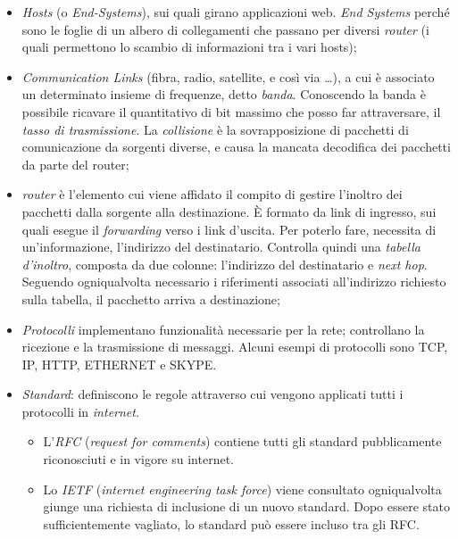 \begin{itemize}
    \item
        \textit{Hosts} (o \textit{End-Systems}), sui quali girano applicazioni web. \textit{End Systems} perché sono le foglie di un albero di collegamenti che passano per diversi \textit{router} (i quali permettono lo scambio di informazioni tra i vari hosts);
    \item
        \textit{Communication Links} (fibra, radio, satellite, e così via \ldots), a cui è associato un determinato insieme di frequenze, detto \textit{banda}. Conoscendo la banda è possibile ricavare il quantitativo di bit massimo che posso far attraversare, il \textit{tasso di trasmissione}. La \textit{collisione} è la sovrapposizione di pacchetti di comunicazione da sorgenti diverse, e causa la mancata decodifica dei pacchetti da parte del router;
    \item
        \textit{router} è l'elemento cui viene affidato il compito di gestire l'inoltro dei pacchetti dalla sorgente alla destinazione. È formato da link di ingresso, sui quali esegue il \textit{forwarding} verso i link d'uscita. Per poterlo fare, necessita di un'informazione, l'indirizzo del destinatario. Controlla quindi una \textit{tabella d'inoltro}, composta da due colonne: l'indirizzo del destinatario e \textit{next hop}. Seguendo ogniqualvolta necessario i riferimenti associati all'indirizzo richiesto sulla tabella, il pacchetto arriva a destinazione;
    \item
        \textit{Protocolli} implementano funzionalità necessarie per la rete; controllano la ricezione e la trasmissione di messaggi. Alcuni esempi di protocolli sono TCP, IP, HTTP, ETHERNET e SKYPE.
    \item
        \textit{Standard}: definiscono le regole attraverso cui vengono applicati tutti i protocolli in \textit{internet}.
        \begin{itemize}
            \item L'\textit{RFC} (\textit{request for comments}) contiene tutti gli standard pubblicamente riconosciuti e in vigore su internet.
            \item Lo \textit{IETF} (\textit{internet engineering task force}) viene consultato ogniqualvolta giunge una richiesta di inclusione di un nuovo standard. Dopo essere stato sufficientemente vagliato, lo standard può essere incluso tra gli RFC.
        \end{itemize}
\end{itemize}

